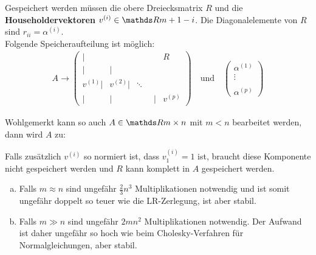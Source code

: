 



Gespeichert werden müssen die obere Dreiecksmatrix $R$ und die 
\textbf{Householdervektoren} 
$v^{(i)}\in \R{m+1-i}$.
Die Diagonalelemente von $R$ sind $r_{ii} = \alpha^{(i)}$. \\
Folgende Speicheraufteilung ist möglich:
\begin{gather*}
A \longrightarrow \left(
\begin{array}{rrrrr}
|&&& R \\
|&| \\
v^{(1)}| & v^{(2)}|&\ddots ~~\\
| &|&\phantom{v^{(i)}}|& v^{(p)}			
\end{array}
\right)
\quad \text{und} \quad 
\begin{pmatrix}
\alpha^{(1)} \\ \vdots \\ \\ \alpha^{(p)}
\end{pmatrix}
\end{gather*}

Wohlgemerkt kann so auch $A\in \R{m\times n}$ mit $m<n$ bearbeitet werden,
dann wird $A$ zu:


Falls zusätzlich $v^{(i)}$ so normiert ist,
dass $v_1^{(i)} = 1$ ist, braucht diese Komponente nicht gespeichert werden 
und $R$ kann komplett in $A$ gespeichert werden.

\begin{enumerate}[a)]
	\item Falls $m\approx n$ sind ungefähr $\frac{2}{3}n^3$ Multiplikationen notwendig
	und ist somit ungefähr doppelt so teuer wie die LR-Zerlegung, ist aber stabil.
	\item Falls $m\gg n$ sind ungefähr $2mn^2$ Multiplikationen notwendig.
	Der Aufwand ist daher ungefähr so hoch wie beim Cholesky-Verfahren für Normalgleichungen,
	aber stabil.
\end{enumerate}
